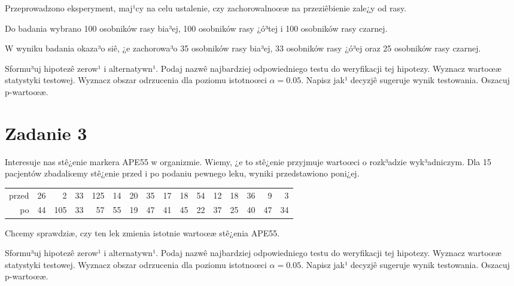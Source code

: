 \documentclass[a4paper,12pt]{article}
\begin{document}
  Przeprowadzono eksperyment, maj¹cy na celu ustalenie, czy zachorowalnoœæ na przeziêbienie zale¿y od rasy.
  
  Do badania wybrano 100 osobników rasy bia³ej, 100 osobników rasy ¿ó³tej i 100 osobników rasy czarnej. 
  
  W wyniku badania okaza³o siê, ¿e zachorowa³o 35 osobników rasy bia³ej, 33 osobników rasy ¿ó³ej oraz 25 osobników rasy czarnej. 
  
  Sformu³uj hipotezê zerow¹ i alternatywn¹. 
  Podaj nazwê najbardziej odpowiedniego testu do weryfikacji tej hipotezy. 
  Wyznacz wartoœæ statystyki testowej. 
  Wyznacz obszar odrzucenia dla poziomu istotnoœci $\alpha=0.05$. 
  Napisz jak¹ decyzjê sugeruje wynik testowania. Oszacuj p-wartoœæ. \vspace{1cm} 

  \section*{Zadanie 3}
     
  Interesuje nas stê¿enie markera APE55  w organizmie. 
  Wiemy, ¿e to stê¿enie przyjmuje wartoœci o rozk³adzie wyk³adniczym. 
  Dla 15 pacjentów zbadaliœmy stê¿enie przed i po podaniu pewnego leku, 
  wyniki przedstawiono poni¿ej.
  
  \vspace{0.5cm} 
  \noindent\begin{center} 
\begin{tabular}{rrrrrrrrrrrrrrrr}
  \hline
  \hline
przed & 26 & 2 & 33 & 125 & 14 & 20 & 35 & 17 & 18 & 54 & 12 & 18 & 36 & 9 & 3 \\
  po & 44 & 105 & 33 & 57 & 55 & 19 & 47 & 41 & 45 & 22 & 37 & 25 & 40 & 47 & 34 \\
   \hline
\end{tabular}
 
  \end{center} 
  \vspace{0.5cm}
  
  Chcemy sprawdziæ, czy ten lek zmienia istotnie wartoœæ stê¿enia APE55.
  
  Sformu³uj hipotezê zerow¹ i alternatywn¹. 
  Podaj nazwê najbardziej odpowiedniego testu do weryfikacji tej hipotezy. 
  Wyznacz wartoœæ statystyki testowej. 
  Wyznacz obszar odrzucenia dla poziomu istotnoœci $\alpha=0.05$. 
  Napisz jak¹ decyzjê sugeruje wynik testowania. Oszacuj p-wartoœæ. \vspace{1cm} 
\end{document}

